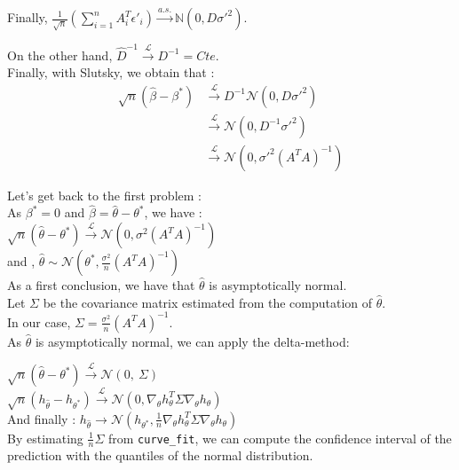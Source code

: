 \documentclass{article}
\begin{document}
Finally, $\frac{1}{\sqrt{n}} \left( \sum_{i=1}^{n}  A_i^T \epsilon'_i \right) \xrightarrow{a.s.} \mathbb{N}(0, D \sigma'^{2})$. 


On the other hand, $\hat{D}^{-1} \xrightarrow{\mathcal{L}} D^{-1} = Cte $.\\

Finally, with Slutsky, we obtain that : \\


\begin{align*}
    \sqrt{n} (\hat{\beta} - \beta^*) &\xrightarrow{\mathcal{L}} D^{-1}\mathcal{N}(0, D \sigma'^2) \\
    &\xrightarrow{\mathcal{L}} \mathcal{N}(0, D^{-1} \sigma'^2) \\
    &\xrightarrow{\mathcal{L}} \mathcal{N}(0, \sigma'^2 (A^T A)^{-1})
\end{align*}


Let's get back to the first problem : \\

As $\beta ^* = 0 $ and $\hat{\beta} = \hat{\theta} - \theta ^* $, we have : \\


$\sqrt{n} (\hat{\theta} - \theta^*) \xrightarrow{\mathcal{L}} \mathcal{N}(0, \sigma^2 (A^T A)^{-1})$\\

and , $\hat{\theta} \sim \mathcal{N}(\theta^*, \frac{\sigma^2}{n} (A^T A)^{-1})$\\

As a first conclusion, we have that $\hat{\theta}$ is asymptotically normal. \\


Let $\Sigma$ be the covariance matrix estimated from the computation of $\hat{\theta}$. \\
In our case, $\Sigma = \frac{\sigma^2}{n} (A^T A)^{-1}$. \\


As $\hat{\theta}$ is asymptotically normal, we can apply the delta-method: 

$\sqrt{n} (\hat{\theta} -\theta^*) \xrightarrow{\mathcal{L}} \mathcal{N}(0, \ \Sigma)$\\
$\sqrt{n} (h_{\hat{\theta}} -h_{\theta^*}) \xrightarrow{\mathcal{L}} \mathcal{N}(0, \nabla_\theta h_\theta ^T \Sigma  \nabla_\theta h_\theta)$\\

And finally : 
$h_{\hat{\theta}} \rightarrow \mathcal{N}(h_{\theta^*}, \frac{1}{n}\nabla_\theta h_\theta ^T \Sigma  \nabla_\theta h_\theta)$\\

By estimating $\frac{1}{n} \Sigma$ from \texttt{curve\_fit}, we can compute the confidence interval of the prediction with the quantiles of the normal distribution.
\end{document}
